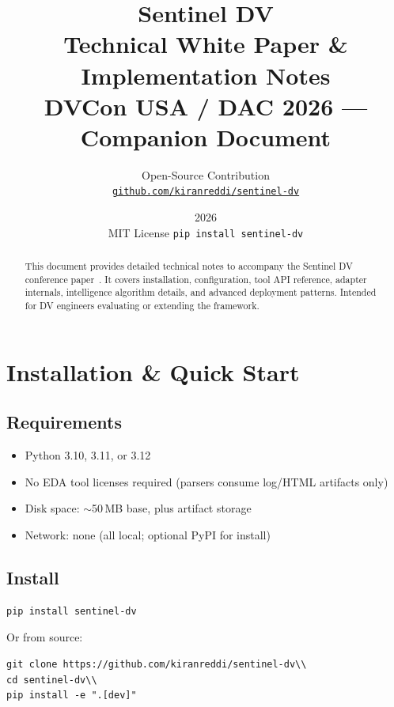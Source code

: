 \documentclass[11pt,a4paper]{article}
\title{%
  {\color{codeblue}\textbf{Sentinel DV}}\\[6pt]
  \large Technical White Paper \& Implementation Notes\\[4pt]
  \normalsize DVCon USA / DAC 2026 — Companion Document
}
\author{Open-Source Contribution \\ \texttt{\href{https://github.com/kiranreddi/sentinel-dv}{github.com/kiranreddi/sentinel-dv}}}
\date{2026 \\ MIT License \quad \texttt{pip install sentinel-dv}}
\begin{document}
\maketitle
\thispagestyle{fancy}

\begin{abstract}
This document provides detailed technical notes to accompany the Sentinel DV conference
paper~\cite{sdv_paper}. It covers installation, configuration, tool API reference,
adapter internals, intelligence algorithm details, and advanced deployment patterns.
Intended for DV engineers evaluating or extending the framework.
\end{abstract}

\tableofcontents
\newpage

\section{Installation \& Quick Start}

\subsection{Requirements}
\begin{itemize}
  \item Python 3.10, 3.11, or 3.12
  \item No EDA tool licenses required (parsers consume log/HTML artifacts only)
  \item Disk space: $\sim$50\,MB base, plus artifact storage
  \item Network: none (all local; optional PyPI for install)
\end{itemize}

\subsection{Install}
\begin{lstlisting}[style=yaml,numbers=none,xleftmargin=0em]
pip install sentinel-dv
\end{lstlisting}

Or from source:
\begin{lstlisting}[style=yaml,numbers=none,xleftmargin=0em]
git clone https://github.com/kiranreddi/sentinel-dv\\
cd sentinel-dv\\
pip install -e ".[dev]"
\end{lstlisting}
\end{document}
